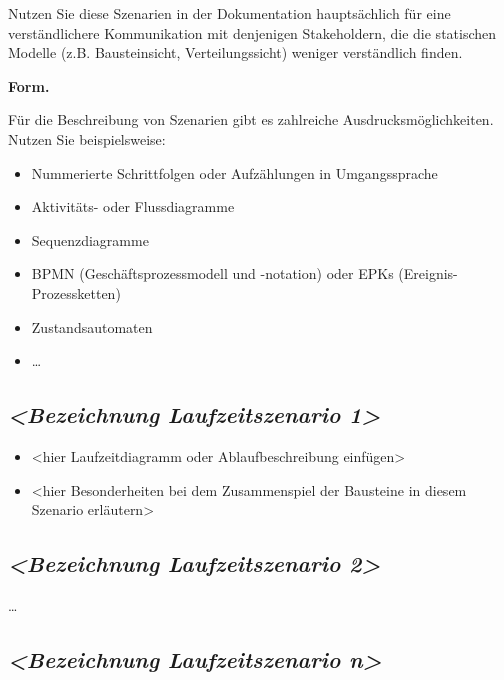 \documentclass[]{article}
\begin{document}
Nutzen Sie diese Szenarien in der Dokumentation hauptsächlich für eine
verständlichere Kommunikation mit denjenigen Stakeholdern, die die
statischen Modelle (z.B. Bausteinsicht, Verteilungssicht) weniger
verständlich finden.

\textbf{Form.}

Für die Beschreibung von Szenarien gibt es zahlreiche
Ausdrucksmöglichkeiten. Nutzen Sie beispielsweise:

\begin{itemize}
\item
  Nummerierte Schrittfolgen oder Aufzählungen in Umgangssprache
\item
  Aktivitäts- oder Flussdiagramme
\item
  Sequenzdiagramme
\item
  BPMN (Geschäftsprozessmodell und -notation) oder EPKs
  (Ereignis-Prozessketten)
\item
  Zustandsautomaten
\item
  \ldots{}
\end{itemize}

\hypertarget{__emphasis_bezeichnung_laufzeitszenario_1_emphasis}{%
\subsection{\texorpdfstring{\emph{\textless{}Bezeichnung
Laufzeitszenario
1\textgreater{}}}{\textless{}Bezeichnung Laufzeitszenario 1\textgreater{}}}\label{__emphasis_bezeichnung_laufzeitszenario_1_emphasis}}

\begin{itemize}
\item
  \textless{}hier Laufzeitdiagramm oder Ablaufbeschreibung
  einfügen\textgreater{}
\item
  \textless{}hier Besonderheiten bei dem Zusammenspiel der Bausteine in
  diesem Szenario erläutern\textgreater{}
\end{itemize}

\hypertarget{__emphasis_bezeichnung_laufzeitszenario_2_emphasis}{%
\subsection{\texorpdfstring{\emph{\textless{}Bezeichnung
Laufzeitszenario
2\textgreater{}}}{\textless{}Bezeichnung Laufzeitszenario 2\textgreater{}}}\label{__emphasis_bezeichnung_laufzeitszenario_2_emphasis}}

\ldots{}

\hypertarget{__emphasis_bezeichnung_laufzeitszenario_n_emphasis}{%
\subsection{\texorpdfstring{\emph{\textless{}Bezeichnung
Laufzeitszenario
n\textgreater{}}}{\textless{}Bezeichnung Laufzeitszenario n\textgreater{}}}\label{__emphasis_bezeichnung_laufzeitszenario_n_emphasis}}
\end{document}
